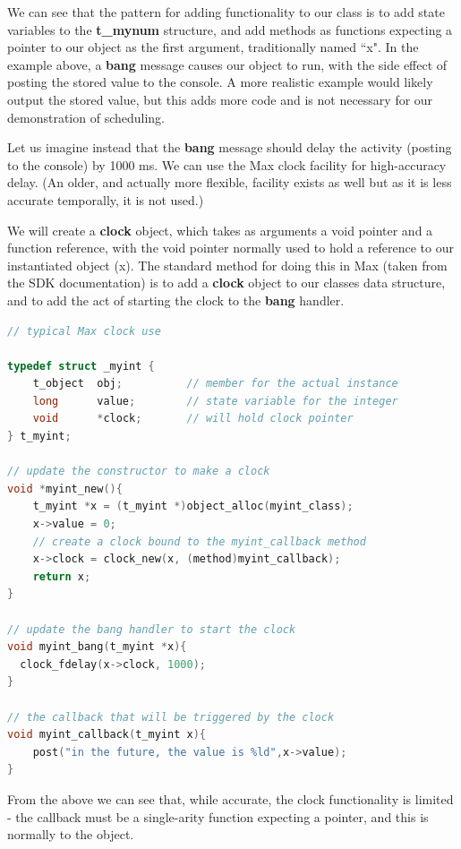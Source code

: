 \documentclass[acmsmall]{acmart}
\begin{document}
We can see that the pattern for adding functionality to our class is to
add state variables to the \textbf{t\_mynum} structure, and add methods as
functions expecting a pointer to our object as the first argument,
traditionally named ``x". In the example above, a \textbf{bang} message causes our
object to run, with the side effect of posting the stored value to the console. A more
realistic example would likely output the stored value, but this adds more code
and is not necessary for our demonstration of scheduling.

Let us imagine instead that the \textbf{bang} message should delay the activity
(posting to the console) by 1000 ms. We can use the Max clock facility for high-accuracy
delay. (An older, and actually more flexible, facility exists as well but as it is
less accurate temporally, it is not used.) 

We will create a \textbf{clock} object, which takes as arguments a void pointer and a function
reference, with the void pointer normally used to hold a reference to our instantiated
object (x). The standard method for doing this in Max (taken from the SDK documentation)
is to add a \textbf{clock} object to our classes data structure, and to add the act
of starting the clock to the \textbf{bang} handler.

\begin{lstlisting}[language=C]
// typical Max clock use

typedef struct _myint {
    t_object  obj;          // member for the actual instance 
    long      value;        // state variable for the integer
    void      *clock;       // will hold clock pointer
} t_myint;

// update the constructor to make a clock
void *myint_new(){
    t_myint *x = (t_myint *)object_alloc(myint_class);
    x->value = 0;
    // create a clock bound to the myint_callback method
    x->clock = clock_new(x, (method)myint_callback); 
    return x;
}

// update the bang handler to start the clock
void myint_bang(t_myint *x){
  clock_fdelay(x->clock, 1000);
}

// the callback that will be triggered by the clock
void myint_callback(t_myint x){
    post("in the future, the value is %ld",x->value);
}
\end{lstlisting}


From the above we can see that, while accurate, the clock functionality is limited -
the callback must be a single-arity function expecting a pointer, and this
is normally to the object.
\end{document}
